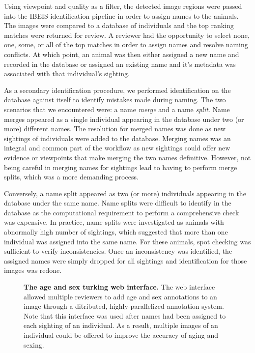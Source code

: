Using viewpoint and quality as a filter, the detected image regions were passed into the IBEIS identification pipeline in order to assign names to the animals.  The images were compared to a database of individuals and the top ranking matches were returned for review.  A reviewer had the opportunity to select none, one, some, or all of the top matches in order to assign names and resolve naming conflicts.  At which point, an animal was then either assigned a new name and recorded in the database or assigned an existing name and it's metadata was associated with that individual's sighting.  

As a secondary identification procedure, we performed identification on the database against itself to identify mistakes made during naming.  The two scenarios that we encountered were: a name \textit{merge} and a name \textit{split}.  Name merges appeared as a single individual appearing in the database under two (or more) different names.  The resolution for merged names was done as new sightings of individuals were added to the database.  Merging names was an integral and common part of the workflow as new sightings could offer new evidence or viewpoints that make merging the two names definitive.  However, not being careful in merging names for sightings lead to having to perform merge splits, which was a more demanding process.

Conversely, a name split appeared as two (or more) individuals appearing in the database under the same name.  Name splits were difficult to identify in the database as the computational requirement to perform a comprehensive check was expensive.  In practice, name splits were investigated as animals with abnormally high number of sightings, which suggested that more than one individual was assigned into the same name.  For these animals, spot checking was sufficient to verify inconsistencies.  Once an inconsistency was identified, the assigned names were simply dropped for all sightings and identification for those images was redone.

\begin{figure}[t]%
	\centering
    	\caption[The Age and Sex Turking Web Interface]{\textbf{The age and sex turking web interface.}  The web interface allowed multiple reviewers to add age and sex annotations to an image through a ditributed, highly-parallelized annotation system.  Note that this interface was used after names had been assigned to each sighting of an individual.  As a result, multiple images of an individual could be offered to improve the accuracy of aging and sexing.}
    	\label{fig:turking_interface_metadata}
\end{figure}

